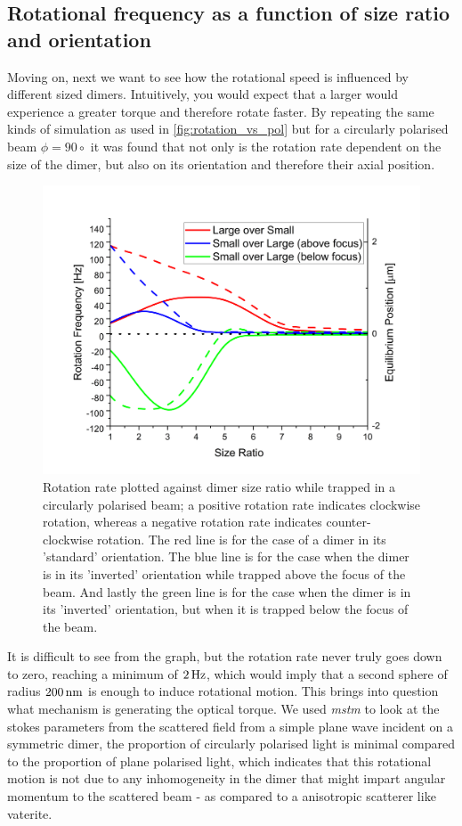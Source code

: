\subsection{Rotational frequency as a function of size ratio and orientation}
Moving on, next we want to see how the rotational speed is influenced by 
different sized dimers. Intuitively, you would expect that a larger would 
experience a greater torque and therefore rotate faster. By repeating the same kinds of simulation as used in \ref{fig:rotation_vs_pol} but for a circularly polarised beam $\phi=90\circ$ it was found that not only is the rotation rate dependent on the size of the dimer, but also on its orientation and therefore their axial position.
\begin{figure}[h!]
  \centering
  \includegraphics[width=\linewidth]{rotation_rate_vs_size.png}
  \caption{Rotation rate plotted against dimer size ratio while trapped in a
  	circularly polarised beam; a positive rotation rate indicates clockwise 
  	rotation, whereas a negative rotation rate indicates counter-clockwise 
  	rotation. The red line is for the case of a dimer in its 'standard' 
  	orientation. The blue line is for the case when the dimer is in its 
  	'inverted' orientation while trapped above the focus of the beam. And 
  	lastly the green line is for the case when the dimer is in its 
  	'inverted' orientation, but when it is trapped below the focus of the 
  	beam.}
\end{figure}

It is difficult to see from the graph, but the rotation rate never
truly goes down to zero, reaching a minimum of $2\,{\rm Hz}$, which would
imply that a second sphere of radius $200\,{\rm nm}$ is enough to
induce rotational motion. This brings into question what mechanism is
generating the optical torque. We used \textit{mstm} to look at the stokes
parameters from the scattered field from a simple plane wave incident
on a symmetric dimer, the proportion of circularly polarised light is 
minimal compared to the proportion of plane polarised light, which 
indicates that this rotational motion is not due to any inhomogeneity 
in the dimer that might impart angular momentum to the scattered beam - 
as compared to a anisotropic scatterer like vaterite. 

